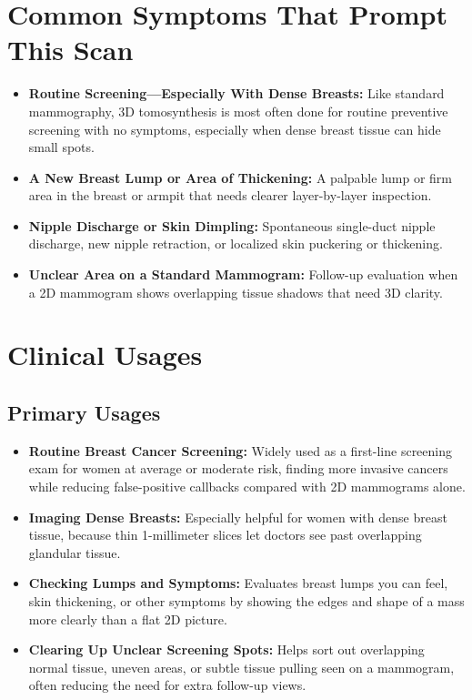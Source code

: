 \section{Common Symptoms That Prompt This Scan}
\begin{itemize}
\item \textbf{Routine Screening---Especially With Dense Breasts:} Like standard mammography, 3D tomosynthesis is most often done for routine preventive screening with no symptoms, especially when dense breast tissue can hide small spots.
\item \textbf{A New Breast Lump or Area of Thickening:} A palpable lump or firm area in the breast or armpit that needs clearer layer-by-layer inspection.
\item \textbf{Nipple Discharge or Skin Dimpling:} Spontaneous single-duct nipple discharge, new nipple retraction, or localized skin puckering or thickening.
\item \textbf{Unclear Area on a Standard Mammogram:} Follow-up evaluation when a 2D mammogram shows overlapping tissue shadows that need 3D clarity.
\end{itemize}

\section{Clinical Usages}

\subsection{Primary Usages}
\begin{itemize}
\item \textbf{Routine Breast Cancer Screening:} Widely used as a first-line screening exam for women at average or moderate risk, finding more invasive cancers while reducing false-positive callbacks compared with 2D mammograms alone.
\item \textbf{Imaging Dense Breasts:} Especially helpful for women with dense breast tissue, because thin 1-millimeter slices let doctors see past overlapping glandular tissue.
\item \textbf{Checking Lumps and Symptoms:} Evaluates breast lumps you can feel, skin thickening, or other symptoms by showing the edges and shape of a mass more clearly than a flat 2D picture.
\item \textbf{Clearing Up Unclear Screening Spots:} Helps sort out overlapping normal tissue, uneven areas, or subtle tissue pulling seen on a mammogram, often reducing the need for extra follow-up views.
\end{itemize}

